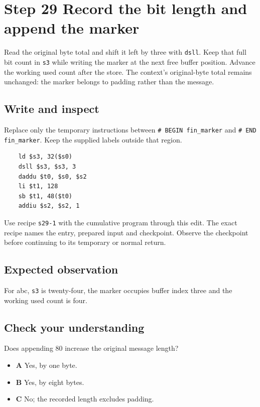 \section{Step 29 Record the bit length and append the marker}\label{sha-s29}

Read the original byte total and shift it left by three with \texttt{dsll}. Keep that full bit count in \texttt{s3} while writing the marker at the next free buffer position. Advance the working used count after the store. The context's original-byte total remains unchanged: the marker belongs to padding rather than the message.

\subsection{Write and inspect}
Replace only the temporary instructions between \texttt{\# BEGIN fin\_marker} and \texttt{\# END fin\_marker}. Keep the supplied labels outside that region.

\begin{verbatim}
    ld $s3, 32($s0)
    dsll $s3, $s3, 3
    daddu $t0, $s0, $s2
    li $t1, 128
    sb $t1, 48($t0)
    addiu $s2, $s2, 1
\end{verbatim}

Use recipe \texttt{s29-1} with the cumulative program through this edit. The exact recipe names the entry, prepared input and checkpoint. Observe the checkpoint before continuing to its temporary or normal return.

\subsection{Expected observation}
For abc, \texttt{s3} is twenty-four, the marker occupies buffer index three and the working used count is four.

\subsection{Check your understanding}
Does appending 80 increase the original message length?

\begin{itemize}
  \item \textbf{A} Yes, by one byte.
  \item \textbf{B} Yes, by eight bytes.
  \item \textbf{C} No; the recorded length excludes padding.
\end{itemize}
